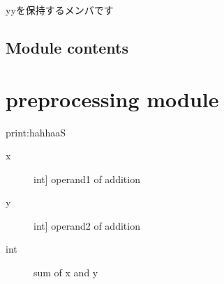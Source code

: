 \documentclass[a4paper,10pt,dvipdfmx]{sphinxmanual}
\begin{document}
\begin{fulllineitems}
\begin{fulllineitems}
\end{fulllineitems}


\begin{fulllineitems}
\label{\detokenize{camera:camera.camera.Sample.foo}}
\sphinxAtStartPar
yyを保持するメンバです

\end{fulllineitems}


\end{fulllineitems}



\subsection{Module contents}
\label{\detokenize{camera:module-camera}}\label{\detokenize{camera:module-contents}}

\section{preprocessing module}
\label{\detokenize{preprocessing:module-preprocessing}}\label{\detokenize{preprocessing:preprocessing-module}}\label{\detokenize{preprocessing::doc}}

\begin{fulllineitems}
\label{\detokenize{preprocessing:preprocessing.my_sum}}
\sphinxAtStartPar
print:hahhaaS
\begin{description}
\item[{x}] \leavevmode{[}int{]}
\sphinxAtStartPar
operand1 of addition

\item[{y}] \leavevmode{[}int{]}
\sphinxAtStartPar
operand2 of addition

\end{description}
\begin{description}
\item[{int}] \leavevmode
\sphinxAtStartPar
sum of x and y

\end{description}

\end{fulllineitems}
\end{document}
